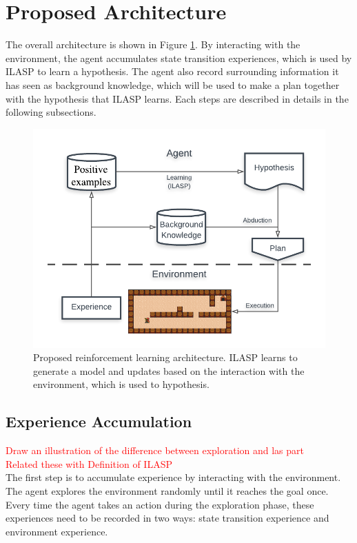 \section{Proposed Architecture}
\label{proposed_architecture_section}

The overall architecture is shown in Figure \ref{proposed_architecture}. By interacting with the environment, the agent accumulates state transition experiences, which is used by ILASP to learn a hypothesis.
The agent also record surrounding information it has seen as background knowledge, which will be used to make a plan together with the hypothesis that ILASP learns. 
Each steps are described in details in the following subsections. 

\begin{figure}[!htb]
\centering
\includegraphics[width=1.0\textwidth]{./figures/architecture}
\caption{Proposed reinforcement learning architecture. ILASP learns to generate a model and updates based on the interaction with the environment, which is used to hypothesis. }
\label{proposed_architecture}
\end{figure}

\subsection{Experience Accumulation}
\label{experience_accumulation}
\textcolor{red}{Draw an illustration of the difference between exploration and las part}\\
\textcolor{red}{Related these with Definition of ILASP}\\
The first step is to accumulate experience by interacting with the environment. The agent explores the environment randomly until it reaches the goal once. 
Every time the agent takes an action during the exploration phase, these experiences need to be recorded in two ways: state transition experience and environment experience.

